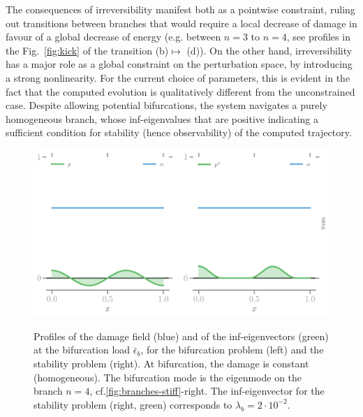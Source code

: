 The consequences of irreversibility manifest both as a pointwise constraint, ruling out transitions between branches that would require a local decrease of damage in favour of a global decrease of energy (e.g. between $n=3$ to $n=4$, see profiles in the Fig.~\ref{fig:kick} of the transition (b)$\mapsto$ (d)). 
On the other hand, irreversibility has a major role  as a global constraint on the perturbation space, by introducing a strong nonlinearity. For the current choice of parameters, this is evident in the fact that the computed evolution is qualitatively different from the unconstrained case. Despite allowing potential bifurcations, the system navigates a purely homogeneous branch, whose inf-eigenvalues that are positive indicating a sufficient condition for stability (hence observability) of the computed trajectory.

\begin{figure}[htbp]
    \centering
    \includegraphics*[width=.95\textwidth]{../images/profiles-bif-stab-7f4361886184f3c6791fe16bf4f4b3f2.pdf}
        \label{fig:irreversibility-profiles}
    \caption{Profiles of the damage field (blue) and of the inf-eigenvectors (green)  at the bifurcation load $\bar \epsilon_b$, for the bifurcation problem (left) and the stability problem (right).
    At bifurcation, the damage is constant (homogeneous). 
    The bifurcation mode is the eigenmode on the branch $n=4$, cf.\ref{fig:branches-stiff}-right. 
    The inf-eigenvector for the stability problem (right, green) corresponds to $\lambda_b=2\cdot 10^{-2}$.}
\end{figure}

